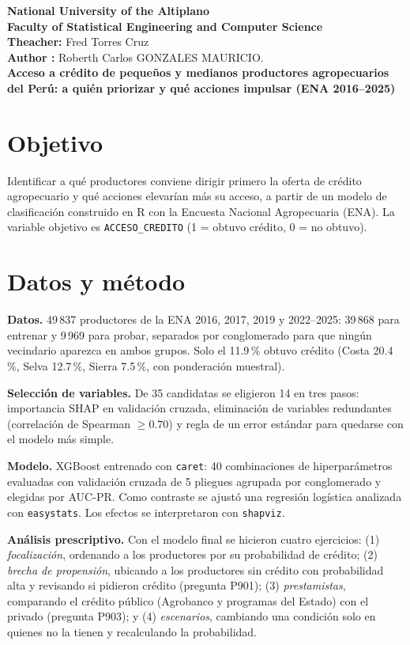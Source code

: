 \documentclass[12pt]{article}
\begin{document}
\noindent \textbf{National University of the Altiplano\\
Faculty of Statistical Engineering and Computer Science\\
Theacher: } Fred Torres Cruz\\
\textbf{Author :} Roberth Carlos GONZALES MAURICIO.\\


\noindent
\textbf{ Acceso a crédito de pequeños y medianos productores agropecuarios del Perú: a quién priorizar y qué acciones impulsar (ENA 2016--2025)}

\renewcommand{\figurename}{Figura}
\renewcommand{\tablename}{Tabla}
\renewcommand{\refname}{Referencias}

\section{Objetivo}
Identificar a qué productores conviene dirigir primero la oferta de crédito agropecuario y qué acciones elevarían más su acceso, a partir de un modelo de clasificación construido en R con la Encuesta Nacional Agropecuaria (ENA). La variable objetivo es \texttt{ACCESO\_CREDITO} (1 = obtuvo crédito, 0 = no obtuvo).

\section{Datos y método}
\textbf{Datos.} 49\,837 productores de la ENA 2016, 2017, 2019 y 2022--2025: 39\,868 para entrenar y 9\,969 para probar, separados por conglomerado para que ningún vecindario aparezca en ambos grupos. Solo el 11.9\,\% obtuvo crédito (Costa 20.4\,\%, Selva 12.7\,\%, Sierra 7.5\,\%, con ponderación muestral).

\textbf{Selección de variables.} De 35 candidatas se eligieron 14 en tres pasos: importancia SHAP en validación cruzada, eliminación de variables redundantes (correlación de Spearman $\geq 0.70$) y regla de un error estándar para quedarse con el modelo más simple.

\textbf{Modelo.} XGBoost entrenado con \texttt{caret}: 40 combinaciones de hiperparámetros evaluadas con validación cruzada de 5 pliegues agrupada por conglomerado y elegidas por AUC-PR. Como contraste se ajustó una regresión logística analizada con \texttt{easystats}. Los efectos se interpretaron con \texttt{shapviz}.

\textbf{Análisis prescriptivo.} Con el modelo final se hicieron cuatro ejercicios: (1) \textit{focalización}, ordenando a los productores por su probabilidad de crédito; (2) \textit{brecha de propensión}, ubicando a los productores sin crédito con probabilidad alta y revisando si pidieron crédito (pregunta P901); (3) \textit{prestamistas}, comparando el crédito público (Agrobanco y programas del Estado) con el privado (pregunta P903); y (4) \textit{escenarios}, cambiando una condición solo en quienes no la tienen y recalculando la probabilidad.
\end{document}
